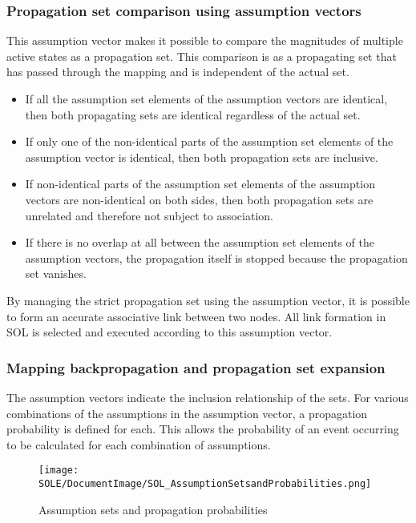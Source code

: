 \documentclass[12pt]{article}
\begin{document}
\subsubsection{Propagation set comparison using assumption vectors}\label{propagation-set-comparison-using-assumption-vectors}

This assumption vector makes it possible to compare the magnitudes of
multiple active states as a propagation set. This comparison is as a
propagating set that has passed through the mapping and is independent
of the actual set.

\begin{itemize}
\item
  If all the assumption set elements of the assumption vectors are
  identical, then both propagating sets are identical regardless of the
  actual set.
\item
  If only one of the non-identical parts of the assumption set elements
  of the assumption vector is identical, then both propagation sets are
  inclusive.
\item
  If non-identical parts of the assumption set elements of the
  assumption vectors are non-identical on both sides, then both
  propagation sets are unrelated and therefore not subject to
  association.
\item
  If there is no overlap at all between the assumption set elements of
  the assumption vectors, the propagation itself is stopped because the
  propagation set vanishes.
\end{itemize}

By managing the strict propagation set using the assumption vector, it
is possible to form an accurate associative link between two nodes. All
link formation in SOL is selected and executed according to this
assumption vector.

\subsubsection{Mapping backpropagation and propagation set
expansion}\label{mapping-backpropagation-and-propagation-set-expansion}

The assumption vectors indicate the inclusion relationship of the sets.
For various combinations of the assumptions in the assumption vector, a
propagation probability is defined for each. This allows the probability
of an event occurring to be calculated for each combination of
assumptions.

\begin{figure}[ht]
  \centering
  \texttt{[image: SOLE/DocumentImage/SOL\_AssumptionSetsandProbabilities.png]}
  \caption{Assumption sets and propagation probabilities}
  \label{fig:assumption_sets_and_propagation_probabilities}
\end{figure}
\end{document}
